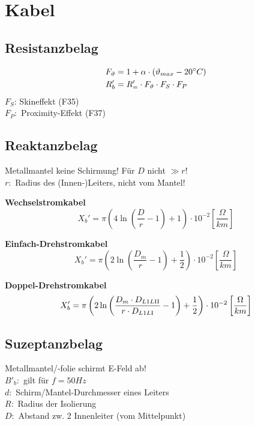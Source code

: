\section{Kabel}

\subsection{Resistanzbelag}
\vspace{-2em}
\begin{align*}
    F_\vartheta &= 1+\alpha \cdot(\vartheta_{max} - 20\degree C)\\
    R'_b &=R'_=\cdot F_\vartheta \cdot F_S \cdot F_P
\end{align*}
$F_S$: Skineffekt (F35) \\
$F_P:$ Proximity-Effekt (F37)

\subsection{Reaktanzbelag}
Metallmantel keine Schirmung! Für $D$ nicht $\gg r$!\\
\indent $r:$ Radius des (Innen-)Leiters, nicht vom Mantel!

\textbf{Wechselstromkabel}
\begin{equation*}
    X_{b}' = \pi \left( 4 \ln \left( \frac{D}{r} -1\right) +1 \right) \cdot 10 ^{-2}   \left[\frac{\Omega}{km}\right]
\end{equation*}

\textbf{Einfach-Drehstromkabel}
\begin{equation*}
    X_{b}' = \pi \left( 2 \ln \left( \frac{D_{m}}{r} -1\right) +\frac{1}{2} \right) \cdot 10 ^{-2}   \left[\frac{\Omega}{km}\right]
\end{equation*}

\textbf{Doppel-Drehstromkabel}
\begin{equation*}
    X_{b}' = \pi \left( 2 \ln \left( \frac{D_{m} \cdot D_{L1L\RN{2}}}{r \cdot D_{L1L\RN{1}}} -1\right) +\frac{1}{2} \right) \cdot 10 ^{-2}   \left[\frac{\Omega}{km}\right]
\end{equation*}

\subsection{Suzeptanzbelag}
Metallmantel/-folie schirmt E-Feld ab!\\
\indent $B'_b:$ gilt für $f=50Hz$\\
\indent $d:$ Schirm/Mantel-Durchmesser eines Leiters\\
\indent $R:$ Radius der Isolierung\\
\indent $D:$ Abstand zw. 2 Innenleiter (vom Mittelpunkt)

